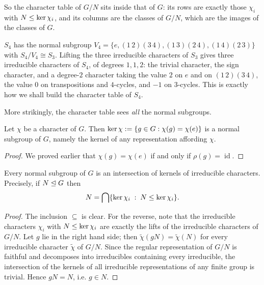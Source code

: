 \documentclass[a4paper]{scrartcl}
\newcommand{\id}{\operatorname{id}}
\begin{document}
\begin{center}
\end{center}

So the character table of $G/N$ sits inside that of $G$: its rows are exactly those $\chi_i$ with $N \leq \operatorname{ker}\chi_i$, and its columns are the classes of $G/N$, which are the images of the classes of $G$.

\begin{example}
	$S_4$ has the normal subgroup $V_4 = \{e, (1\,2)(3\,4), (1\,3)(2\,4), (1\,4)(2\,3)\}$ with $S_4/V_4 \cong S_3$. Lifting the three irreducible characters of $S_3$ gives three irreducible characters of $S_4$, of degrees $1, 1, 2$: the trivial character, the sign character, and a degree-$2$ character taking the value $2$ on $e$ and on $(1\,2)(3\,4)$, the value $0$ on transpositions and $4$-cycles, and $-1$ on $3$-cycles. This is exactly how we shall build the character table of $S_4$.
\end{example}

More strikingly, the character table sees \emph{all} the normal subgroups.

\begin{proposition}
	Let $\chi$ be a character of $G$. Then $\operatorname{ker}\chi := \{g \in G : \chi(g) = \chi(e)\}$ is a normal subgroup of $G$, namely the kernel of any representation affording $\chi$.
\end{proposition}
\begin{proof}
	We proved earlier that $\chi(g) = \chi(e)$ if and only if $\rho(g) = \id$.
\end{proof}

\begin{theorem}
	Every normal subgroup of $G$ is an intersection of kernels of irreducible characters. Precisely, if $N \trianglelefteq G$ then
	$$N = \bigcap \{\operatorname{ker}\chi_i \; : \; N \leq \operatorname{ker} \chi_i\}.$$
\end{theorem}
\begin{proof}
	The inclusion $\subseteq$ is clear. For the reverse, note that the irreducible characters $\chi_i$ with $N \leq \operatorname{ker}\chi_i$ are exactly the lifts of the irreducible characters of $G/N$. Let $g$ lie in the right hand side; then $\tilde\chi(gN) = \tilde\chi(N)$ for every irreducible character $\tilde\chi$ of $G/N$. Since the regular representation of $G/N$ is faithful and decomposes into irreducibles containing every irreducible, the intersection of the kernels of all irreducible representations of any finite group is trivial. Hence $gN = N$, i.e. $g \in N$.
\end{proof}
\end{document}
